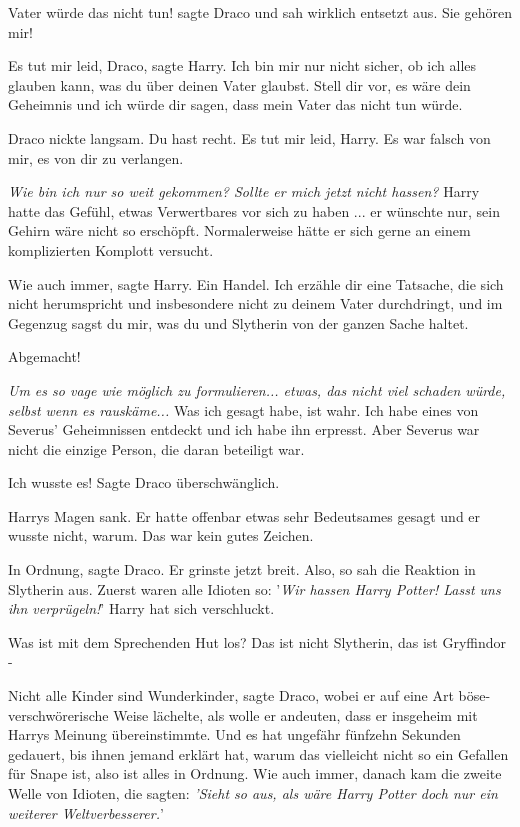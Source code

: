 \glqq{}Vater würde das nicht tun!\grqq{} sagte Draco und sah wirklich entsetzt
aus. \glqq{}Sie gehören mir!\grqq{}

\glqq{}Es tut mir leid, Draco\grqq{}, sagte Harry. \glqq{}Ich bin mir nur nicht
sicher, ob ich alles glauben kann, was du über deinen Vater glaubst. Stell dir
vor, es wäre dein Geheimnis und ich würde dir sagen, dass mein Vater das nicht
tun würde.\grqq{}

Draco nickte langsam. \glqq{}Du hast recht. Es tut mir leid, Harry. Es war falsch
von mir, es von dir zu verlangen.\grqq{}

\emph{Wie bin ich nur so weit gekommen? Sollte er mich jetzt nicht hassen?}
Harry hatte das Gefühl, etwas Verwertbares vor sich zu haben ... er wünschte
nur, sein Gehirn wäre nicht so erschöpft. Normalerweise hätte er sich gerne an
einem komplizierten Komplott versucht.

\glqq{}Wie auch immer\grqq{}, sagte Harry. \glqq{}Ein Handel. Ich erzähle dir eine
Tatsache, die sich nicht herumspricht und insbesondere nicht zu deinem Vater
durchdringt, und im Gegenzug sagst du mir, was du und Slytherin von der ganzen
Sache haltet.\grqq{}

\glqq{}Abgemacht!\grqq{}

\emph{Um es so vage wie möglich zu formulieren... etwas, das nicht viel schaden
würde, selbst wenn es rauskäme...} \glqq{}Was ich gesagt habe, ist wahr. Ich habe
eines von Severus' Geheimnissen entdeckt und ich habe ihn erpresst. Aber Severus
war nicht die einzige Person, die daran beteiligt war.\grqq{}

\glqq{}Ich wusste es!\grqq{} Sagte Draco überschwänglich.

Harrys Magen sank. Er hatte offenbar etwas sehr Bedeutsames gesagt und er wusste
nicht, warum. Das war kein gutes Zeichen.

\glqq{}In Ordnung\grqq{}, sagte Draco. Er grinste jetzt breit. \glqq{}Also, so sah
die Reaktion in Slytherin aus. Zuerst waren alle Idioten so: '\emph{Wir hassen
Harry Potter! Lasst uns ihn verprügeln!}'\grqq{} Harry hat sich verschluckt.

\glqq{}Was ist mit dem Sprechenden Hut los? Das ist nicht Slytherin, das ist
Gryffindor -\grqq{}

\glqq{}Nicht alle Kinder sind Wunderkinder\grqq{}, sagte Draco, wobei er auf eine
Art böse-verschwörerische Weise lächelte, als wolle er andeuten, dass er
insgeheim mit Harrys Meinung übereinstimmte. \glqq{}Und es hat ungefähr fünfzehn
Sekunden gedauert, bis ihnen jemand erklärt hat, warum das vielleicht nicht so
ein Gefallen für Snape ist, also ist alles in Ordnung. Wie auch immer, danach
kam die zweite Welle von Idioten, die sagten: \emph{'Sieht so aus, als wäre
Harry Potter doch nur ein weiterer Weltverbesserer.}'\grqq{}

